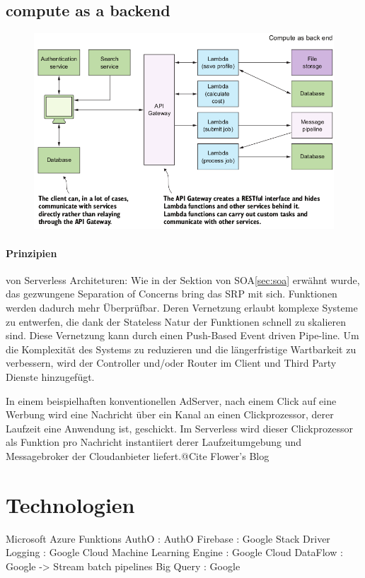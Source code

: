 \documentclass[
12pt,
english,
ngerman,
headsepline,
twoside,
openright,
numbers=noenddot,version=first
]{scrreprt}
\begin{document}
\subsection{compute as a backend}

\begin{figure}[H]
	\includegraphics[scale=0.36]{./pics/arch-compute-as-a-backend.png}
\end{figure}


\paragraph{Prinzipien}\label{par:serverless-principles} von Serverless Architeturen: \cite{serverlessArchAWS}
Wie in der Sektion von SOA\ref{sec:soa} erwähnt wurde, das gezwungene Separation of Concerns bring das \acrfull{SRP} mit sich. Funktionen werden dadurch mehr Überprüfbar.
Deren Vernetzung erlaubt komplexe Systeme zu entwerfen, die dank der Stateless Natur der Funktionen schnell zu skalieren sind.
Diese Vernetzung kann durch einen Push-Based Event driven Pipe-line.
Um die Komplexität des Systems zu reduzieren und die längerfristige Wartbarkeit zu verbessern, wird der Controller und/oder Router im Client und Third Party Dienste hinzugefügt.

In einem beispielhaften konventionellen AdServer, nach einem Click auf eine Werbung wird eine Nachricht über ein Kanal an einen Clickprozessor, derer Laufzeit eine Anwendung ist, geschickt. Im Serverless wird dieser Clickprozessor als Funktion pro Nachricht instantiiert derer Laufzeitumgebung und Messagebroker der Cloudanbieter liefert.@Cite Flower's Blog


\section{Technologien}
Microsoft Azure Funktions 
AuthO : AuthO
Firebase : Google
Stack Driver Logging : Google
Cloud Machine Learning Engine : Google
Cloud DataFlow : Google -> Stream batch pipelines
Big Query : Google
\end{document}
